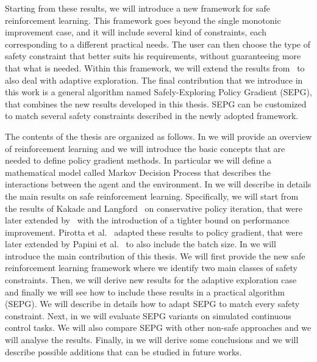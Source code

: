 Starting from these results, we will introduce a new framework for safe reinforcement learning. This framework goes beyond the single monotonic improvement case, and it will include several kind of constraints, each corresponding to a different practical needs. The user can then choose the type of safety constraint that better suits his requirements, without guaranteeing more that what is needed. Within this framework, we will extend the results from~\cite{adaptive_step} to also deal with adaptive exploration. The final contribution that we introduce in this work is a general algorithm named Safely-Exploring Policy Gradient (SEPG), that combines the new results developed in this thesis. SEPG can be customized to match several safety constraints described in the newly adopted framework. 

The contents of the thesis are organized as follows. In  we will provide an overview of reinforcement learning and we will introduce the basic concepts that are needed to define policy gradient methods. In particular we will define a mathematical model called Markov Decision Process that describes the interactions between the agent and the environment. In  we will describe in details the main results on safe reinforcement learning. Specifically, we will start from the results of Kakade and Langford~\cite{Kakade02approximatelyoptimal} on conservative policy iteration, that were later extended by~\cite{safe_iteration} with the introduction of a tighter bound on performance improvement. Pirotta et al.~\cite{adaptive_step} adapted these results to policy gradient, that were later extended by Papini et al.~\cite{adaptive_batch} to also include the batch size. In  we will introduce the main contribution of this thesis. We will first provide the new safe reinforcement learning framework where we identify two main classes of safety  constraints. Then, we will derive new results for the adaptive exploration case and finally we will see how to include these results in a practical algorithm (SEPG). We will describe in details how to adapt SEPG to match every safety constraint. Next, in  we will evaluate SEPG variants on simulated continuous control tasks. We will also compare SEPG with other non-safe approaches and we will analyse the results. Finally, in  we will derive some conclusions and we will describe possible additions that can be studied in future works.
 



